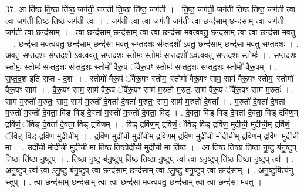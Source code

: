 \documentclass[17pt]{extarticle}
\begin{document}
37. आ ति॑ष्ठ ति॒ष्ठा ति॑ष्ठ॒ जग॑ती॒ जग॑ती ति॒ष्ठा ति॑ष्ठ॒ जग॑ती । . ति॒ष्ठ॒ जग॑ती॒ जग॑ती तिष्ठ तिष्ठ॒ जग॑ती त्वा त्वा॒ जग॑ती तिष्ठ तिष्ठ॒ जग॑ती त्वा । . जग॑ती त्वा त्वा॒ जग॑ती॒ जग॑ती त्वा॒ छन्द॑सा॒म् छन्द॑साम् त्वा॒ जग॑ती॒ जग॑ती त्वा॒ छन्द॑साम् । . त्वा॒ छन्द॑सा॒म् छन्द॑साम् त्वा त्वा॒ छन्द॑सा मवत्ववतु॒ छन्द॑साम् त्वा त्वा॒ छन्द॑सा मवतु । . छन्द॑सा मवत्ववतु॒ छन्द॑सा॒म् छन्द॑सा मवतु सप्तद॒शः स॑प्तद॒शो॑ ऽवतु॒ छन्द॑सा॒म् छन्द॑सा मवतु सप्तद॒शः । . अ॒व॒तु॒ स॒प्त॒द॒शः स॑प्तद॒शो॑ ऽवत्ववतु सप्तद॒शः स्तोमः॒ स्तोमः॑ सप्तद॒शो॑ ऽवत्ववतु सप्तद॒शः स्तोमः॑ । . स॒प्त॒द॒शः स्तोमः॒ स्तोमः॑ सप्तद॒शः स॑प्तद॒शः स्तोमो॑ वैरू॒पं ॅवै॑रू॒पꣳ स्तोमः॑ सप्तद॒शः स॑प्तद॒शः स्तोमो॑ वैरू॒पम् । . स॒प्त॒द॒श इति॑ सप्त - द॒शः । . स्तोमो॑ वैरू॒पं ॅवै॑रू॒पꣳ स्तोमः॒ स्तोमो॑ वैरू॒पꣳ साम॒ साम॑ वैरू॒पꣳ स्तोमः॒ स्तोमो॑ वैरू॒पꣳ साम॑ । . वै॒रू॒पꣳ साम॒ साम॑ वैरू॒पं ॅवै॑रू॒पꣳ साम॑ म॒रुतो॑ म॒रुतः॒ साम॑ वैरू॒पं ॅवै॑रू॒पꣳ साम॑ म॒रुतः॑ । . साम॑ म॒रुतो॑ म॒रुतः॒ साम॒ साम॑ म॒रुतो॑ दे॒वता॑ दे॒वता॑ म॒रुतः॒ साम॒ साम॑ म॒रुतो॑ दे॒वता᳚ । . म॒रुतो॑ दे॒वता॑ दे॒वता॑ म॒रुतो॑ म॒रुतो॑ दे॒वता॒ विड् विड् दे॒वता॑ म॒रुतो॑ म॒रुतो॑ दे॒वता॒ विट् । . दे॒वता॒ विड् विड् दे॒वता॑ दे॒वता॒ विड् द्रवि॑ण॒म् द्रवि॑णं॒ ॅविड् दे॒वता॑ दे॒वता॒ विड् द्रवि॑णम् । . विड् द्रवि॑ण॒म् द्रवि॑णं॒ ॅविड् विड् द्रवि॑ण॒ मुदी॑ची॒ मुदी॑ची॒म् द्रवि॑णं॒ ॅविड् विड् द्रवि॑ण॒ मुदी॑चीम् । . द्रवि॑ण॒ मुदी॑ची॒ मुदी॑ची॒म् द्रवि॑ण॒म् द्रवि॑ण॒ मुदी॑ची॒ मोदी॑ची॒म् द्रवि॑ण॒म् द्रवि॑ण॒ मुदी॑ची॒ मा । . उदी॑ची॒ मोदी॑ची॒ मुदी॑ची॒ मा ति॑ष्ठ ति॒ष्ठोदी॑ची॒ मुदी॑ची॒ मा ति॑ष्ठ । . आ ति॑ष्ठ ति॒ष्ठा ति॑ष्ठा नु॒ष्टु ब॑नु॒ष्टुप् ति॒ष्ठा ति॑ष्ठा नु॒ष्टुप् । . ति॒ष्ठा॒ नु॒ष्टु ब॑नु॒ष्टुप् ति॑ष्ठ तिष्ठा नु॒ष्टुप् त्वा᳚ त्वा ऽनु॒ष्टुप् ति॑ष्ठ तिष्ठा नु॒ष्टुप् त्वा᳚ । . अ॒नु॒ष्टुप् त्वा᳚ त्वा ऽनु॒ष्टु ब॑नु॒ष्टुप् त्वा॒ छन्द॑सा॒म् छन्द॑साम् त्वा ऽनु॒ष्टु ब॑नु॒ष्टुप् त्वा॒ छन्द॑साम् । . अ॒नु॒ष्टुबित्य॑नु - स्तुप् । . त्वा॒ छन्द॑सा॒म् छन्द॑साम् त्वा त्वा॒ छन्द॑सा मवत्ववतु॒ छन्द॑साम् त्वा त्वा॒ छन्द॑सा मवतु । \newline
\pagebreak
{}
\end{document}
